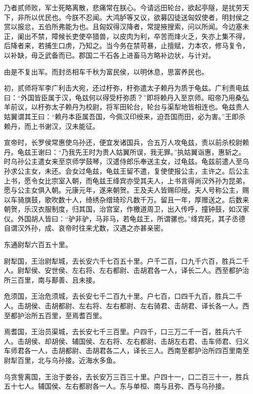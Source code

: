 \documentclass[]{article}
\begin{document}
乃者贰师败，军士死略离散，悲痛常在朕心。今请远田轮台，欲起亭隧，是扰劳天下，非所以优民也。今朕不忍闻。大鸿胪等又议，欲募囚徒送匈奴使者，明封侯之赏以报忿，五伯所弗能为也。且匈奴得汉降者，常提掖搜索，问以所闻。今边塞未正，阑出不禁，障候长吏使卒猎兽，以皮肉为利，卒苦而烽火乏，失亦上集不得，后降者来，若捕生口虏，乃知之。当今务在禁苛暴，止擅赋，力本农，修马复令，以补缺，毋乏武备而已。郡国二千石各上进畜马方略补边状，与计对。

由是不复出军。而封丞相车千秋为富民侯，以明休息，思富养民也。

初，贰师将军李广利击大宛，还过杅弥，杅弥遣太子赖丹为质于龟兹。广利责电兹曰：``外国皆臣属于汉，龟兹何以得受杅弥质？''即将赖丹入至京师。昭帝乃用桑弘羊前议，以杅弥太子赖丹为校尉，将军田轮台，轮台与渠犁地皆相连也。龟兹贵人姑翼谓其王曰：``赖丹本臣属吾国，今佩汉印绶来，迫吾国而田，必为害。''王即杀赖丹，而上书谢汉，汉未能征。

宣帝时，长罗侯常惠使乌孙还，便宜发诸国兵，合五万人攻龟兹，责以前杀校尉赖丹。龟兹王谢曰：``乃我先王时为贵人姑翼所误，我无罪。''执姑翼诣惠，惠斩之。时乌孙公主遣女来至京师学鼓琴，汉遣侍郎乐奉送主女，过龟兹。龟兹前遣人至乌孙求公主女，未还。会女过龟兹，龟兹王留不遣，复使使报公主，主许之。后公主上书，愿令女比宗室入朝，而龟兹王绛宾亦受其夫人，上书言得尚汉外孙为昆弟，愿与公主女俱入朝。元康元年，遂来朝贺。王及夫人皆赐印绶。夫人号称公主，赐以车骑旗鼓，歌吹数十人，绮绣杂缯琦珍凡数千万。留且一年，厚赠送之。后数来朝贺，乐汉衣服制度，归其国，治宫室，作檄道周卫，出入传呼，撞钟鼓，如汉家仪。外国胡人皆曰：``驴非驴，马非马，若龟兹王，所谓骡也。''绛宾死，其子丞德自谓汉外孙，成、哀帝时往来尤数，汉遇之亦甚亲密。

东通尉犁六百五十里。

尉犁国，王治尉犁城，去长安六千七百五十里。户千二百，口九千六百，胜兵二千人。尉犁侯、安世侯、左右将、左右都尉、击胡君各一人，译长二人。西至都护治所三百里，南与鄯善、且未接。

危须国，王治危须城，去长安七千二百九十里。户七百，口四千九百，胜兵二千人。击胡侯、击胡都尉、左右将、左右都尉、左右骑君、击胡君、译长各一人。西至都护治所五百里，至焉耆百里。

焉耆国，王治员渠城，去长安七千三百里。户四千，口三万二千一百，胜兵六千人。击胡侯、却胡侯、辅国侯、左右将、左右都尉、击胡左右君、击车师君、归义车师君各一人，击胡都尉、击胡君各二人，译长三人。西南至都护治所四百里南至尉犁百里，北与乌孙接。近海水多鱼。

乌贪訾离国，王治于娄谷，去长安万三百三十里。户四十一，口二百三十一，胜兵五十七人。辅国侯、左右都尉各一人。东与单桓、南与且弥、西与乌孙接。
\end{document}
